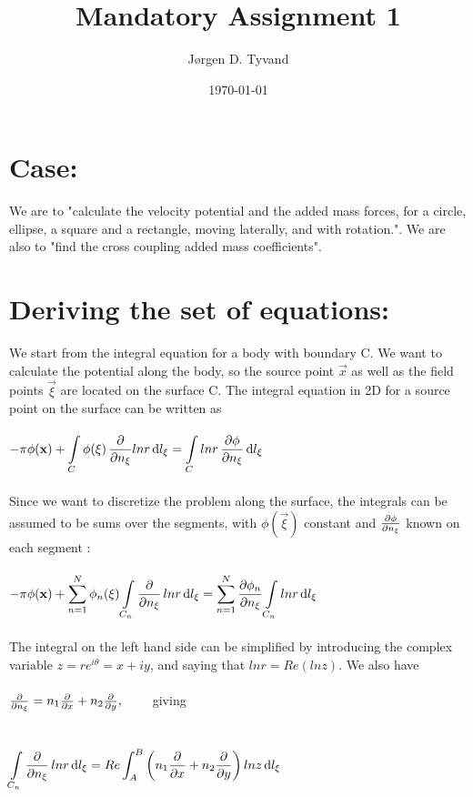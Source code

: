 \documentclass[a4paper,english,11pt,twoside]{article}
\date{\today}
\title{Mandatory Assignment 1}
\author{Jørgen D. Tyvand}
\newcommand{\tab}{\hspace*{2em}}
\begin{document}
\maketitle
\newpage

\section*{Case:}
We are to "calculate the velocity potential and the added mass forces, for a circle, ellipse, a square and a rectangle, moving laterally, and with rotation.". We are also to "find the cross coupling added mass coefficients".
\section*{Deriving the set of equations:}
We start from the integral equation for a body with boundary C. We want to calculate the potential along the body, so the source point $\vec{x}$ as well as the field points $\vec{\xi}$ are located on the surface C. The integral equation in 2D for a source point on the surface can be written as\\
\\
$-\pi\phi(\mathbf{x}) +\displaystyle\int\limits_C\phi(\mathbf{\xi})\, \frac{\partial }{\partial n_{\mathbf{\xi}}}lnr\, \mathrm{d}l_{\mathbf{\xi}} = \int\limits_Clnr\, \frac{\partial \phi}{\partial n_{\mathbf{\xi}}}\, \mathrm{d}l_{\mathbf{\xi}}$\\
\\
Since we want to discretize the problem along the surface, the integrals can be assumed to be sums over the segments, with $\phi(\vec{\xi})$ constant and $\frac{\partial \phi}{\partial n_{\mathbf{\xi}}}$ known on each segment :\\
\\
$-\pi\phi(\mathbf{x}) +\displaystyle\sum_{n=1}^{N}\phi_n(\mathbf{\xi})\int\limits_{C_n}\frac{\partial }{\partial n_{\mathbf{\xi}}}\, lnr\, \mathrm{d}l_{\mathbf{\xi}} = \sum_{n=1}^{N} \frac{\partial \phi_n}{\partial n_{\mathbf{\xi}}}\int\limits_{C_n} lnr\, \mathrm{d}l_{\mathbf{\xi}}$\\
\\
The integral on the left hand side can be simplified by introducing the complex variable $z = r e^{i\theta} = x + iy$, and saying that $lnr = Re(lnz)$. We also have\\
\\
$\pdi{}{n_\vec{\xi}} = n_1\pdi{}{x} + n_2\pdi{}{y}, \tab$ giving\\
\\
\\
$\displaystyle\int\limits_{C_n}\frac{\partial }{\partial n_{\mathbf{\xi}}}\, lnr\, \mathrm{d}l_{\mathbf{\xi}} = Re\displaystyle\int_A^B\left(n_1\frac{\partial }{\partial x} + n_2\frac{\partial }{\partial y}\right)lnz\, \mathrm{d}l_{\mathbf{\xi}}$\\
\end{document}
